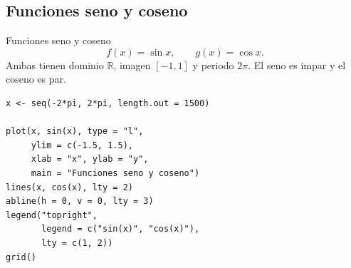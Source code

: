 \documentclass[aspectratio=169,10pt]{beamer}
\newcommand{\R}{\mathbb{R}}
\begin{document}
\subsection{Funciones seno y coseno}
\begin{frame}{Funciones seno y coseno}
\[
f(x)=\sin x,\qquad g(x)=\cos x.
\]
Ambas tienen dominio $\R$, imagen $[-1,1]$ y periodo $2\pi$. El seno es impar y
el coseno es par.

\begin{center}
\end{center}

\begin{verbatim}
x <- seq(-2*pi, 2*pi, length.out = 1500)

plot(x, sin(x), type = "l",
     ylim = c(-1.5, 1.5),
     xlab = "x", ylab = "y",
     main = "Funciones seno y coseno")
lines(x, cos(x), lty = 2)
abline(h = 0, v = 0, lty = 3)
legend("topright",
       legend = c("sin(x)", "cos(x)"),
       lty = c(1, 2))
grid()
\end{verbatim}

\end{frame}
\end{document}
